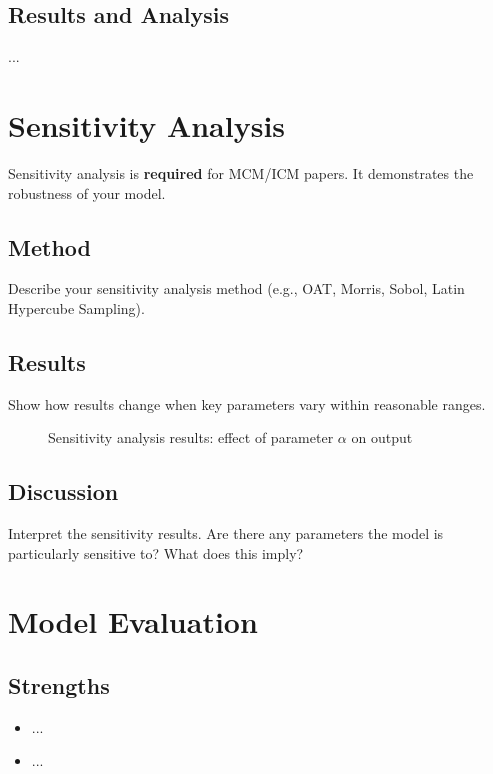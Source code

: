 \documentclass[12pt]{article}
\begin{document}
\subsection{Results and Analysis}
...

\section{Sensitivity Analysis}

Sensitivity analysis is \textbf{required} for MCM/ICM papers.
It demonstrates the robustness of your model.

\subsection{Method}
Describe your sensitivity analysis method (e.g., OAT, Morris, Sobol, Latin Hypercube Sampling).

\subsection{Results}
Show how results change when key parameters vary within reasonable ranges.

\begin{figure}[H]
    \centering
    \caption{Sensitivity analysis results: effect of parameter $\alpha$ on output}
    \label{fig:sensitivity}
\end{figure}

\subsection{Discussion}
Interpret the sensitivity results. Are there any parameters the model is particularly sensitive to? What does this imply?

\section{Model Evaluation}

\subsection{Strengths}
\begin{itemize}
    \item ...
    \item ...
\end{itemize}
\end{document}
